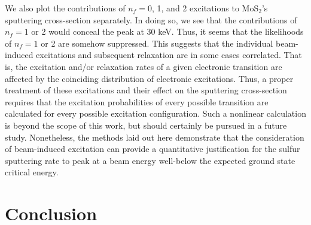 \documentclass{article}
\begin{document}
We also plot the contributions of $n_f = 0$, 1, and 2 excitations to MoS$_2$'s
sputtering cross-section separately.
In doing so, we see that the contributions of $n_f = 1$ or 2 would conceal the
peak at 30 keV. 
Thus, it seems that the likelihoods of $n_f = 1$ or 2 are somehow suppressed.
This suggests that the individual beam-induced excitations and subsequent
relaxation are in some cases correlated.  That is, the excitation and/or
relaxation rates of a given electronic transition are affected by the
coinciding distribution of electronic excitations.
Thus, a proper treatment of these excitations and their effect on the sputtering
cross-section requires that the excitation probabilities of every possible
transition are calculated for every possible excitation configuration.
Such a nonlinear calculation is beyond the scope of this work, but
should certainly be pursued in a future study.
Nonetheless, the methods laid out here demonstrate that the consideration of
beam-induced excitation can provide a quantitative justification for the sulfur
sputtering rate to peak at a beam energy well-below the expected ground state
critical energy.

\section{Conclusion}
\label{sec:conclusion}
\end{document}
